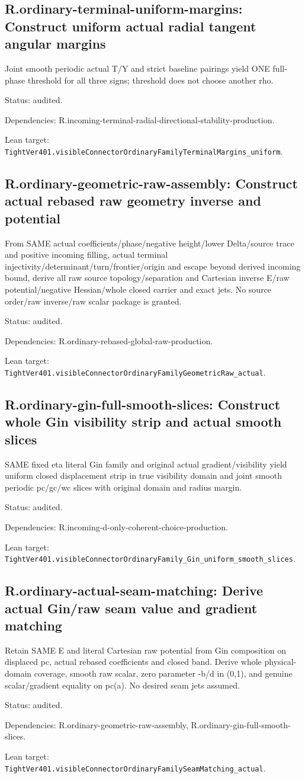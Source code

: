 \documentclass{article}
\begin{document}
\subsection*{R.ordinary-terminal-uniform-margins: Construct uniform actual radial tangent angular margins}
Joint smooth periodic actual T/Y and strict baseline pairings yield ONE full-phase threshold for all three signs; threshold does not choose another rho.
\par Status: audited.
\par Dependencies: R.incoming-terminal-radial-directional-stability-production.
\par Lean target: \texttt{TightVer401.visibleConnectorOrdinaryFamilyTerminalMargins\_uniform}.
\subsection*{R.ordinary-geometric-raw-assembly: Construct actual rebased raw geometry inverse and potential}
From SAME actual coefficients/phase/negative height/lower Delta/source trace and positive incoming filling, actual terminal injectivity/determinant/turn/frontier/origin and escape beyond derived incoming bound, derive all raw source topology/separation and Cartesian inverse E/raw potential/negative Hessian/whole closed carrier and exact jets. No source order/raw inverse/raw scalar package is granted.
\par Status: audited.
\par Dependencies: R.ordinary-rebased-global-raw-production.
\par Lean target: \texttt{TightVer401.visibleConnectorOrdinaryFamilyGeometricRaw\_actual}.
\subsection*{R.ordinary-gin-full-smooth-slices: Construct whole Gin visibility strip and actual smooth slices}
SAME fixed eta literal Gin family and original actual gradient/visibility yield uniform closed displacement strip in true visibility domain and joint smooth periodic pc/gc/wc slices with original domain and radius margin.
\par Status: audited.
\par Dependencies: R.incoming-d-only-coherent-choice-production.
\par Lean target: \texttt{TightVer401.visibleConnectorOrdinaryFamily\_Gin\_uniform\_smooth\_slices}.
\subsection*{R.ordinary-actual-seam-matching: Derive actual Gin/raw seam value and gradient matching}
Retain SAME E and literal Cartesian raw potential from Gin composition on displaced pc, actual rebased coefficients and closed band. Derive whole physical-domain coverage, smooth raw scalar, zero parameter -b/d in (0,1), and genuine scalar/gradient equality on pc(a). No desired seam jets assumed.
\par Status: audited.
\par Dependencies: R.ordinary-geometric-raw-assembly, R.ordinary-gin-full-smooth-slices.
\par Lean target: \texttt{TightVer401.visibleConnectorOrdinaryFamilySeamMatching\_actual}.
\end{document}
